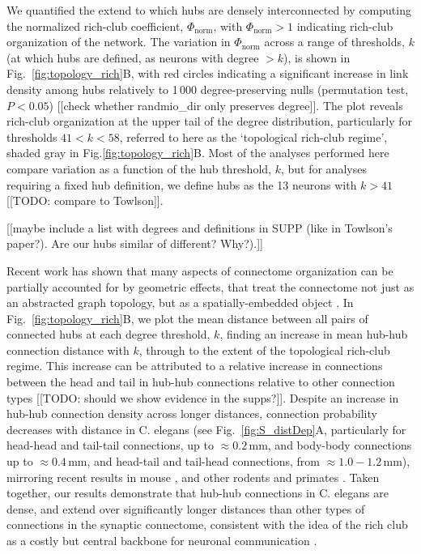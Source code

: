 \documentclass[10pt,letterpaper]{article}
\begin{document}
We quantified the extend to which hubs are densely interconnected by computing the normalized rich-club coefficient, $\Phi_\mathrm{norm}$, with $\Phi_\mathrm{norm} > 1$ indicating rich-club organization of the network.
The variation in $\Phi_\mathrm{norm}$ across a range of thresholds, $k$ (at which hubs are defined, as neurons with degree $>k$), is shown in Fig.~\ref{fig:topology_rich}B, with red circles indicating a significant increase in link density among hubs relatively to 1\,000 degree-preserving nulls (permutation test, $P < 0.05$) [[check whether randmio\_dir only preserves degree]].
The plot reveals rich-club organization at the upper tail of the degree distribution, particularly for thresholds $41 < k < 58$, referred to here as the `topological rich-club regime', shaded gray in Fig.\ref{fig:topology_rich}B.
Most of the analyses performed here compare variation as a function of the hub threshold, $k$, but for analyses requiring a fixed hub definition, we define hubs as the 13 neurons with $k > 41$ [[TODO: compare to Towlson]].

[[maybe include a list with degrees and definitions in SUPP (like in Towlson's paper?). Are our hubs similar of different? Why?).]]

Recent work has shown that many aspects of connectome organization can be partially accounted for by geometric effects, that treat the connectome not just as an abstracted graph topology, but as a spatially-embedded object \cite{Henderson:2014fg, Roberts2016, Horvat:2016ia}.
In Fig.~\ref{fig:topology_rich}B, we plot the mean distance between all pairs of connected hubs at each degree threshold, $k$, finding an increase in mean hub-hub connection distance with $k$, through to the extent of the topological rich-club regime.
This increase can be attributed to a relative increase in connections between the head and tail in hub-hub connections relative to other connection types [[TODO: should we show evidence in the supps?]].
Despite an increase in hub-hub connection density across longer distances, connection probability decreases with distance in C. elegans (see Fig.~\ref{fig:S_distDep}A, particularly for head-head and tail-tail connections, up to $\approx 0.2$\,mm, and body-body connections up to $\approx 0.4$\,mm, and head-tail and tail-head connections, from $\approx 1.0-1.2$\,mm), mirroring recent results in mouse \cite{Goulas:2016hr, Fulcher:2016ck}, and other rodents and primates \cite{Horvat:2016ia}.
Taken together, our results demonstrate that hub-hub connections in C. elegans are dense, and extend over significantly longer distances than other types of connections in the synaptic connectome, consistent with the idea of the rich club as a costly but central backbone for neuronal communication \cite{vandenHeuvel:2012kh}.
\end{document}
